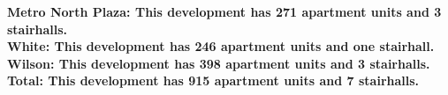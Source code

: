 \bf{Metro North Plaza}: This development has 271 apartment units and 3 stairhalls.\\\bf{White}: This development has 246 apartment units and one stairhall.\\\bf{Wilson}: This development has 398 apartment units and 3 stairhalls.\\\bf{Total}: This development has 915 apartment units and 7 stairhalls.\\